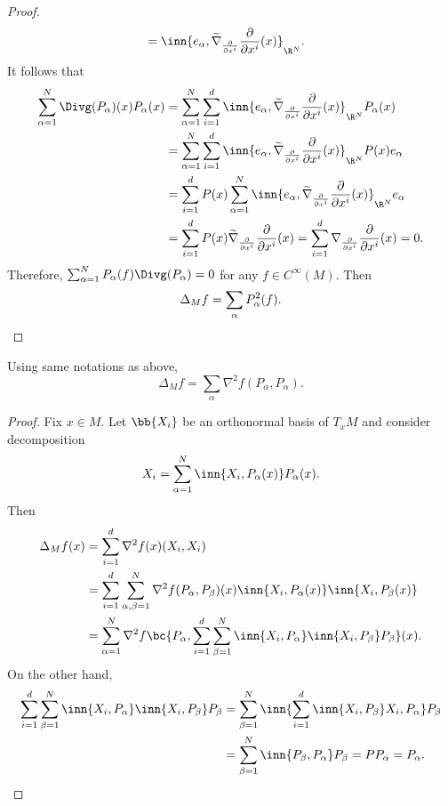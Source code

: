 \begin{proof}
\begin{align*}
        &=\inn{e_\alpha, \widetilde{\nabla}_{\frac{\partial}{\partial x^i}}\frac{\partial}{\partial x^i}(x)}_{\R^N}.
    \end{align*}
    It follows that
    \begin{align*}
        \sum_{\alpha=1}^N\Divg(P_\alpha)(x)P_{\alpha}(x) &= \sum_{\alpha=1}^N \sum_{i=1}^d \inn{e_\alpha, \widetilde{\nabla}_{\frac{\partial}{\partial x^i}}\frac{\partial}{\partial x^i}(x)}_{\R^N} P_{\alpha}(x) \\
        &= \sum_{\alpha=1}^N\sum_{i=1}^d \inn{e_\alpha, \widetilde{\nabla}_{\frac{\partial}{\partial x^i}}\frac{\partial}{\partial x^i}(x)}_{\R^N} P(x)e_{\alpha} \\
        &= \sum_{i=1}^dP(x) \sum_{\alpha=1}^N \inn{e_\alpha, \widetilde{\nabla}_{\frac{\partial}{\partial x^i}}\frac{\partial}{\partial x^i}(x)}_{\R^N} e_\alpha \\
        &= \sum_{i=1}^d P(x)\widetilde{\nabla}_{\frac{\partial}{\partial x^i}}\frac{\partial}{\partial x^i}(x)=\sum_{i=1}^d\nabla_{\frac{\partial}{\partial x^i}}\frac{\partial}{\partial x^i}(x) = 0.
    \end{align*}
    Therefore, $\sum_{\alpha=1}^N P_\alpha(f)\Divg(P_\alpha) = 0$ for any $f \in C^\infty(M)$. Then
    \begin{equation*}
        \Delta_M f = \sum_\alpha P_\alpha^2(f). \qedhere
    \end{equation*}
\end{proof}

\begin{prop}
    Using same notations as above,
    \begin{equation*}
        \Delta_Mf = \sum_\alpha \nabla^2f(P_\alpha,P_\alpha).
    \end{equation*}
\end{prop}
\begin{proof}
    Fix $x \in M$. Let $\bb{X_i}$ be an orthonormal basis of $T_xM$ and consider decomposition
    \begin{equation*}
        X_i = \sum_{\alpha = 1}^N\inn{X_i,P_\alpha(x)}P_\alpha(x).
    \end{equation*}
    Then
    \begin{align*}
        \Delta_M f(x) &= \sum_{i=1}^d \nabla^2f(x)(X_i,X_i)  \\
        &= \sum_{i=1}^d\sum_{\alpha,\beta = 1}^N\nabla^2f(P_\alpha,P_\beta)(x)\inn{X_i,P_\alpha(x)}\inn{X_i,P_\beta(x)} \\
        &= \sum_{\alpha = 1}^N\nabla^2f\bc{P_\alpha, \sum_{i=1}^d\sum_{\beta=1}^N\inn{X_i,P_\alpha}\inn{X_i,P_\beta}P_\beta}(x).
    \end{align*}
    On the other hand,
    \begin{align*}
        \sum_{i=1}^d\sum_{\beta=1}^N\inn{X_i,P_\alpha}\inn{X_i,P_\beta}P_\beta &= \sum_{\beta=1}^N\inn{\sum_{i=1}^d\inn{X_i,P_\beta}X_i,P_\alpha}P_\beta \\
        &= \sum_{\beta=1}^N\inn{P_\beta,P_\alpha}P_\beta = PP_\alpha = P_\alpha.\qedhere
    \end{align*}
\end{proof}

